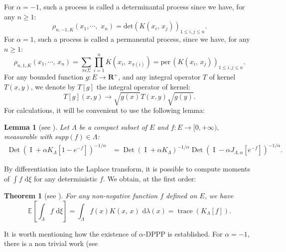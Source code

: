 \documentclass[11pt,a4paper]{amsart}
\newtheorem{Theorem}{Theorem}
\newtheorem{Lemma}{Lemma}
\begin{document}
For $\alpha=-1$, such a process is called a determinantal process
since we have, for any $n \geq 1$:
\begin{equation*}
  \rho_{n,-1,K}(x_1,\cdots,\,\, x_n)={{\text{det}}}(K(x_i,\, x_j))_{1 \le i,j \le n}.
\end{equation*}
For $\alpha=1$, such a process is called a permanental process, since
we have, for any $n \geq 1$:
\begin{equation*}
  \rho_{n,1,K}(x_1,\cdots,\, x_n)=\sum_{\pi\epsilon\Sigma}\prod_{i=1}^{n}K(x_{i},\, x_{\pi(i)})=\text{per}\, (K(x_i,\, x_j))_{1 \le i,j \le n}.
\end{equation*}
For any bounded function $g:E\rightarrow {{\mathbf R}}^+$, and any integral
operator $T$ of kernel $T(x,y)$, we denote by $T[g]$ the integral
operator of kernel:
\begin{equation*}
  T[g](x,y)\rightarrow \sqrt{g(x)} T(x,y) \sqrt{g(y)}.
\end{equation*}
For calculations, it will be convenient to use the following lemma:
\begin{Lemma}[see \cite{MR2018415}]
  \label{lem:calcul}
  Let $\Lambda$ be a compact subset of $E$ and $f:E\rightarrow [0,
  +\infty),$ measurable with supp$(f) \in \Lambda$:
  \begin{align*}
    {\operatorname{Det}}\left( {\operatorname{I}}+ \alpha K_{\Lambda}[1-e^{-f}]\right)
    ^{-1/\alpha}
    
    
    
    &={\operatorname{Det}}\left( {\operatorname{I}}+\alpha K_{\Lambda}\right) ^{-1/\alpha}{\operatorname{Det}}\left(
      {\operatorname{I}}- \alpha J_{\Lambda,\alpha} [e^{-f}] \right)^{-1/\alpha}.
  \end{align*}
\end{Lemma}
By differentiation into the Laplace transform, it is possible to
compute moments of $\int f {\text{ d}}\xi$ for any deterministic $f$. We
obtain, at the first order:
\begin{Theorem}[see
  \cite{MR2018415}] \label{thm:esperance_et_variance} For any
  non-negative function $f$ defined on $E$, we have
  \begin{equation*}
    {{\mathbb E}_{{}}\left[{{\int_\Lambda f{\text{ d}}\xi}}\right]}=\int_\Lambda f(x)K(x,\, x){\text{ d}}\lambda(x)={\operatorname{trace}}(K_\Lambda[f]).
  \end{equation*}
\end{Theorem}
It is worth mentioning how the existence of $\alpha$-DPPP is
established. For $\alpha=-1,$ there is a non trivial work (see
\end{document}
